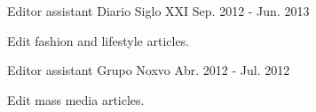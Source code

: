 \begin{cventries}
  \cventry
    {Editor assistant} %
    {Diario Siglo XXI} %
    {} %
    {Sep. 2012 - Jun. 2013} %
    {
      \begin{cvitems} %
        \item {Edit fashion and lifestyle articles.}
      \end{cvitems}
    }

  \cventry
    {Editor assistant} %
    {Grupo Noxvo} %
    {} %
    {Abr. 2012 - Jul. 2012} %
    {
      \begin{cvitems} %
        \item {Edit mass media articles.}
      \end{cvitems}
    }

\end{cventries}
